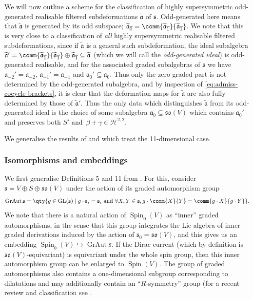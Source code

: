 \documentclass[10pt,a4paper]{amsart}
\numberwithin{equation}{section}
\newcommand{\fa}{\mathfrak{a}}
\newcommand{\fs}{\mathfrak{s}}
\newcommand{\fso}{\mathfrak{so}}
\newcommand{\cH}{\mathcal{H}}
\newcommand{\fatilde}{\widetilde{\fa}}
\newcommand{\1}{\mathbbm{1}}
\DeclareMathOperator{\GL}{GL}
\DeclareMathOperator{\Spin}{Spin}
\DeclareMathOperator{\GrAut}{GrAut}
\begin{document}
We will now outline a scheme for the classification of highly supersymmetric odd-generated realisable filtered subdeformations $\fatilde$ of $\fs$. Odd-generated here means that $\fatilde$ is generated by its odd subspace; $\fatilde_{\overline{0}}=\comm{\fatilde_{\overline{1}}}{\fatilde_{\overline{1}}}$. We note that this is very close to a classification of \emph{all} highly supersymmetric realisable filtered subdeformations, since if $\fatilde$ is a general such subdeformation, the ideal subalgebra $\fatilde'=\comm{\fatilde_{\overline{1}}}{\fatilde_{\overline{1}}}\oplus\fatilde_{\overline{1}}\subseteq\fatilde$ (which we will call the \emph{odd-generated ideal}) is odd-generated realisable, and for the associated graded subalgebras of $\fs$ we have $\fa_{-2}'=\fa_{-2}$, ${\fa_{-1}'=\fa_{-1}}$ and $\fa_0'\subseteq\fa_0$. Thus only the zero-graded part is not determined by the odd-generated subalgebra, and by inspection of \eqref{eq:admiss-cocycle-brackets}, it is clear that the deformation maps for $\fatilde$ are also fully determined by those of $\fatilde'$. Thus the only data which distinguishes $\fatilde$ from its odd-generated ideal is the choice of some subalgebra $\fa_0\subseteq\fso(V)$ which contains $\fa_0'$ and preserves both $S'$ and~${\beta+\gamma\in\cH^{2,2}}$.

We generalise the results of \cite[Section~4]{Figueroa-OFarrill2017_1} and \cite[Section~5]{Santi2022} which treat the 11-dimensional case.

\subsubsection{Isomorphisms and embeddings}

We first generalise Definitions 5 and 11 from \cite{Figueroa-OFarrill2017_1}. For this, consider $\fs=V\oplus S\oplus\fso(V)$ under the action of its graded automorphism group
\[
	\GrAut\fs = \qty{ g\in\GL(\fs)\mid g\cdot\fs_i = \fs_i \text{ and } \forall X,Y\in\fs, g\cdot\comm{X}{Y}=\comm{g\cdot X}{g\cdot Y}}.
\]
We note that there is a natural action of $\Spin_0(V)$ as ``inner'' graded automorphisms, in the sense that this group integrates the Lie algebra of inner graded derivations induced by the action of $\fs_0=\fso(V)$, and this gives us an embedding $\Spin_0(V)\hookrightarrow \GrAut\fs$.
If the Dirac current (which by definition is $\fso(V)$-equivariant) is equivariant under the whole spin group, then this inner automorphism group can be enlarged to $\Spin(V)$. The group of graded automorphisms also contains a one-dimensional subgroup corresponding to dilatations and may additionally contain an ``$R$-symmetry'' group (for a recent review and classification see \cite{Gall2021}.
\end{document}
